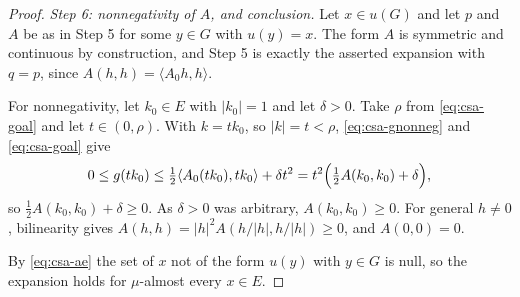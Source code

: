 \begin{proof}
\emph{Step 6: nonnegativity of $A$, and conclusion.}
Let $x\in u(G)$ and let $p$ and $A$ be as in Step 5 for some $y\in G$ with
$u(y)=x$. The form $A$ is symmetric and continuous by construction, and Step 5
is exactly the asserted expansion with $q=p$, since
$A(h,h)=\langle A_0h,h\rangle$.

For nonnegativity, let $k_0\in E$ with $|k_0|=1$ and let $\delta>0$. Take $\rho$
from \eqref{eq:csa-goal} and let $t\in(0,\rho)$. With $k=tk_0$, so $|k|=t<\rho$,
\eqref{eq:csa-gnonneg} and \eqref{eq:csa-goal} give
\[
  0\le g(tk_0)\le\tfrac12\langle A_0(tk_0),tk_0\rangle+\delta t^2
   =t^2\Bigl(\tfrac12A(k_0,k_0)+\delta\Bigr),
\]
so $\tfrac12A(k_0,k_0)+\delta\ge0$. As $\delta>0$ was arbitrary,
$A(k_0,k_0)\ge0$. For general $h\ne0$, bilinearity gives
$A(h,h)=|h|^2A(h/|h|,h/|h|)\ge0$, and $A(0,0)=0$.

By \eqref{eq:csa-ae} the set of $x$ not of the form $u(y)$ with $y\in G$ is
null, so the expansion holds for $\mu$-almost every $x\in E$.
\end{proof}
